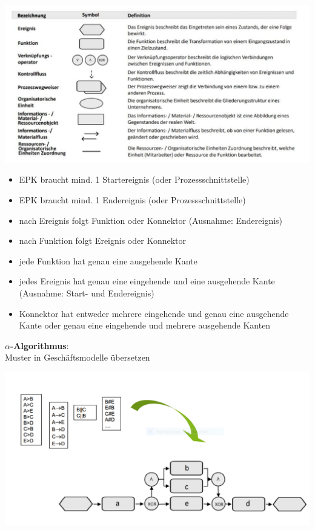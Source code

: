 \documentclass[a4]{scrartcl}
\begin{document}
\begin{center}
    \includegraphics[width=19cm]{digi2.jpg}
\end{center}

\begin{itemize}
    \item EPK braucht mind. 1 Startereignis (oder Prozessschnittstelle)
    \item EPK braucht mind. 1 Endereignis (oder Prozessschnittstelle)
    \item nach Ereignis folgt Funktion oder Konnektor (Ausnahme: Endereignis)
    \item nach Funktion folgt Ereignis oder Konnektor
    \item jede Funktion hat genau eine ausgehende Kante
    \item jedes Ereignis hat genau eine eingehende und eine ausgehende Kante (Ausnahme: Start- und Endereignis)
    \item Konnektor hat entweder mehrere eingehende und genau eine ausgehende Kante oder genau eine eingehende und mehrere ausgehende Kanten
\end{itemize}

\newpage

\textbf{$\alpha$-Algorithmus}: \\

Muster in Geschäftsmodelle übersetzen

\begin{center}
    \includegraphics[width=18cm]{digi3.png}
\end{center}
\end{document}
